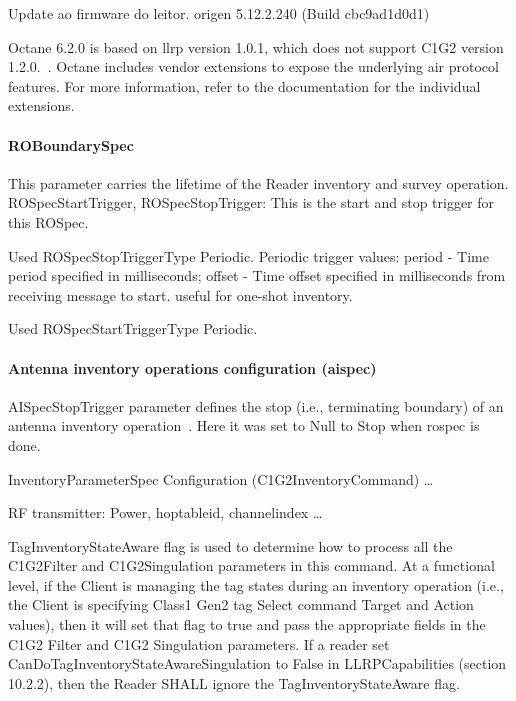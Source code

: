 Update ao firmware do leitor. origen 5.12.2.240 (Build cbc9ad1d0d1)


Octane 6.2.0 is based on \ac{llrp} version 1.0.1, which does not support C1G2 version 1.2.0.~\cite[sec. 3.1.21]{ImpinjOctaneLLRP}. Octane includes vendor extensions to expose the underlying air protocol features. For more information, refer to the documentation for the individual extensions.

\paragraph{ROBoundarySpec}

This parameter carries the lifetime of the Reader inventory and survey operation.
ROSpecStartTrigger, ROSpecStopTrigger: This is the start and stop trigger for this ROSpec.

Used ROSpecStopTriggerType Periodic.
Periodic trigger values: period - Time period specified in milliseconds; offset - Time offset specified in milliseconds from receiving message to start. useful for one-shot inventory.

Used ROSpecStartTriggerType Periodic.

\paragraph{Antenna inventory operations configuration (\ac{aispec})}

AISpecStopTrigger parameter defines the stop (i.e., terminating boundary) of an antenna inventory operation~\cite[sec. 11.2.2.1]{LowLevelReader}. Here it was set to Null to Stop when \ac{rospec} is done.

InventoryParameterSpec Configuration (C1G2InventoryCommand) \dots

RF transmitter: Power, hoptableid, channelindex \dots

TagInventoryStateAware flag is used to determine how to process all the C1G2Filter and C1G2Singulation parameters in this command. At a functional level, if the Client is managing the tag states during an inventory operation (i.e., the Client is specifying Class1 Gen2 tag Select command Target and Action values), then it will set that flag to true and pass the appropriate fields in the C1G2 Filter and C1G2 Singulation parameters. If a reader set CanDoTagInventoryStateAwareSingulation to False in LLRPCapabilities (section 10.2.2), then the Reader SHALL ignore the TagInventoryStateAware flag.

